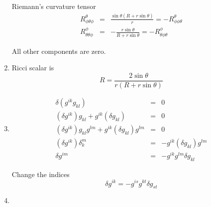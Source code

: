 \documentclass[12pt,a4paper]{article}
\begin{document}
\begin{enumerate}
Riemann's curvature tensor
\begin{eqnarray*}
	R^\theta_{\phi\theta\phi} &=& \frac{\sin\theta(R+r\sin\theta)}{r} = -	R^{\theta}_{\phi\phi\theta} \\
	R^\phi_{\theta\theta\phi} &=& -\frac{r\sin\theta}{R+r\sin\theta} = -R^\phi_{\theta\phi\theta}
\end{eqnarray*}

All other components are zero.




\item

Ricci scalar is
\begin{equation*}
	R=\frac{2\sin\theta}{r(R+r\sin\theta)}
\end{equation*}



\item
\begin{eqnarray*}
	\delta(g^{ik}g_{kl})&=&0 \\
	(\delta g^{ik})g_{kl} + g^{ik}(\delta g_{kl}) &=& 0 \\
	(\delta g^{ik})g_{kl}g^{lm} + g^{ik}(\delta g_{kl})g^{lm} &=& 0  \\
	(\delta g^{ik})\delta_k^m &=& - g^{ik}(\delta g_{kl})g^{lm} \\
	\delta g^{im} &=& - g^{ik} g^{lm} \delta g_{kl} 
\end{eqnarray*}

Change the indices
\begin{equation*}
	\delta g^{ik} = - g^{is}g^{kt}\delta g_{st}
\end{equation*}





\item











\end{enumerate}
\end{document}
